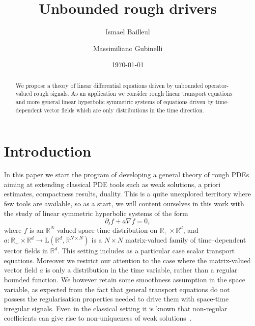 \documentclass[11pt,a4paper]{amsart}
\title[Unbounded rough drivers]{Unbounded rough drivers}
\date{\today}
\author[I. Bailleul]{Ismael Bailleul}
\author[M. Gubinelli]{Massimiliano Gubinelli}
\newcommand{\RR}{\mathbb{R}}  \newcommand{\CC}{\mathbb{C}}  \newcommand{\LL}{\mathbb{L}}  \newcommand{\WW}{\mathbb{W}}
\newcommand{\ssk}{\smallskip}
\numberwithin{equation}{section} %
\begin{document}
\begin{abstract}
We propose a theory of linear differential equations driven by unbounded operator-valued rough signals. As an application we consider rough linear transport equations and more general linear hyperbolic symmetric systems of equations driven by time-dependent vector fields which are only distributions in the time direction. 
\end{abstract}

\maketitle

\section{Introduction}
\label{SectionIntroduction}

In this paper we start the program of developing a general theory of rough PDEs aiming at extending classical PDE tools such as weak solutions, a priori estimates, compactness results, duality. This is a quite unexplored territory where few tools are available, so as a start, we will content ourselves in this work with the study of linear symmetric hyperbolic systems of the form
\begin{equation}
\label{eq:basic}
\partial_t f + a\nabla f = 0,
\end{equation}
where $f$ is an $\RR^N$-valued space-time distribution on $\RR_+\times\RR^d$, and $a :\RR_+\times \RR^d \to  \textrm{L}(\RR^d, \RR^{N\times N})$ is a $N\times N$ matrix-valued family of time--dependent vector fields in $\RR^d$. This setting includes as a particular case scalar transport equations. Moreover we restrict our attention to the case where the matrix-valued vector field $a$ is only a distribution in the time variable, rather than a regular bounded function. We however retain some smoothness assumption in the space variable, as expected from the fact that general transport equations do not possess the regularisation properties needed to drive them with space-time irregular signals. Even in the classical setting it is known that non-regular coefficients  can give rise to non-uniqueness of weak solutions~\cite{FlandoliMilano}.

\ssk
\end{document}
